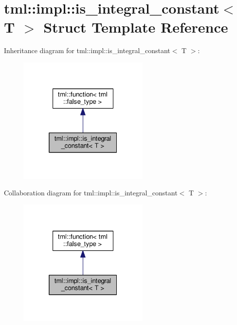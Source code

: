 \hypertarget{structtml_1_1impl_1_1is__integral__constant}{\section{tml\+:\+:impl\+:\+:is\+\_\+integral\+\_\+constant$<$ T $>$ Struct Template Reference}
\label{structtml_1_1impl_1_1is__integral__constant}
}


Inheritance diagram for tml\+:\+:impl\+:\+:is\+\_\+integral\+\_\+constant$<$ T $>$\+:
\nopagebreak
\begin{figure}[H]
\begin{center}
\leavevmode
\includegraphics[width=184pt]{structtml_1_1impl_1_1is__integral__constant__inherit__graph}
\end{center}
\end{figure}


Collaboration diagram for tml\+:\+:impl\+:\+:is\+\_\+integral\+\_\+constant$<$ T $>$\+:
\nopagebreak
\begin{figure}[H]
\begin{center}
\leavevmode
\includegraphics[width=184pt]{structtml_1_1impl_1_1is__integral__constant__coll__graph}
\end{center}
\end{figure}
